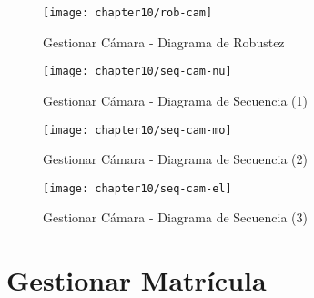       \begin{landscape}
    \begin{figure}[H]
        \centering
        \texttt{[image: chapter10/rob-cam]}
        \caption{Gestionar Cámara - Diagrama de Robustez}
        \label{fig:rob-cam}
    \end{figure}
  
    \begin{figure}[H]
        \centering
        \texttt{[image: chapter10/seq-cam-nu]}
        \caption{Gestionar Cámara - Diagrama de Secuencia (1) }
        \label{fig:seq-cam-nu}
    \end{figure}
    
    \begin{figure}[H]
        \centering
        \texttt{[image: chapter10/seq-cam-mo]}
        \caption{Gestionar Cámara - Diagrama de Secuencia (2) }
        \label{fig:seq-cam-mo}
    \end{figure}
    
    \begin{figure}[H]
        \centering
        \texttt{[image: chapter10/seq-cam-el]}
        \caption{Gestionar Cámara - Diagrama de Secuencia (3) }
        \label{fig:seq-cam-el}
    \end{figure}
    \end{landscape}

\section{Gestionar Matrícula}

